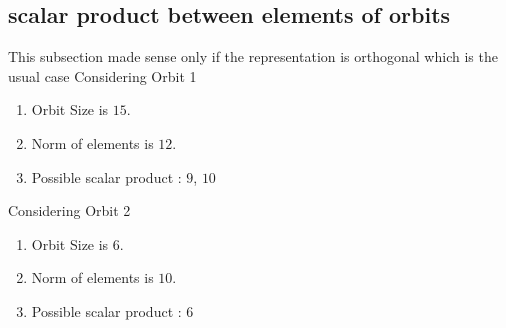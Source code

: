 \documentclass[12pt]{article}
\begin{document}
\subsection{scalar product between elements of orbits}
\noindent This subsection made sense only if the representation is orthogonal which is the usual case
Considering Orbit 1
\begin{enumerate}
\item Orbit Size is $15$.
\item Norm of elements is $12$.
\item Possible scalar product : $9$, $10$
\end{enumerate}
Considering Orbit 2
\begin{enumerate}
\item Orbit Size is $6$.
\item Norm of elements is $10$.
\item Possible scalar product : $6$
\end{enumerate}
\end{document}
